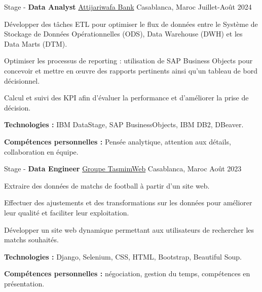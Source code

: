 \begin{cventries}
\vspace{0.5cm}
\cventry
    {Stage - \textbf{Data Analyst} } %
    {\href{https://www.attijariwafabank.com/}{Attijariwafa Bank}} %
    {Casablanca, Maroc} %
    {Juillet-Août 2024} %
    {
      \begin{cvitems}
        \item {Développer des tâches ETL pour optimiser le flux de données entre le Système de Stockage de Données Opérationnelles (ODS), Data Warehouse (DWH) et les Data Marts (DTM).}
        \item {Optimiser les processus de reporting : utilisation de SAP Business Objects pour concevoir et mettre en œuvre des rapports pertinents ainsi qu'un tableau de bord décisionnel.}
        \item {Calcul et suivi des KPI afin d’évaluer la performance et d’améliorer la prise de décision.}
        \item {\textbf{Technologies :} IBM DataStage, SAP BusinessObjects, IBM DB2, DBeaver.}
        \item {\textbf{Compétences personnelles :} Pensée analytique, attention aux détails, collaboration en équipe.}
      \end{cvitems}
    }

\vspace{0.5cm}
\cventry
    {Stage - \textbf{Data Engineer}} %
    {\href{https://www.tasmimweb.com/}{Groupe TasmimWeb}} %
    {Casablanca, Maroc} %
    {Août 2023} %
    {
      \begin{cvitems}
        \item {Extraire des données de matchs de football à partir d'un site web.}
        \item {Effectuer des ajustements et des transformations sur les données pour améliorer leur qualité et faciliter leur exploitation.}
        \item {Développer un site web dynamique permettant aux utilisateurs de rechercher les matchs souhaités.}
        \item {\textbf{Technologies :} Django, Selenium, CSS, HTML, Bootstrap, Beautiful Soup.}
        \item {\textbf{Compétences personnelles :} négociation, gestion du temps, compétences en présentation.}
      \end{cvitems}
    }
\end{cventries}
